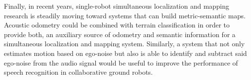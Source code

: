 Finally, in recent years, single-robot simultaneous localization and mapping
research is steadily moving toward systems that can build metric-semantic maps.
Acoustic odometry could be combined with terrain classification in order to
provide both, an auxiliary source of odometry and semantic information for a
simultaneous localization and mapping system. Similarly, a system that not only
estimates motion based on ego-noise but also is able to identify and subtract
said ego-noise from the audio signal would be useful to improve the performance
of speech recognition in collaborative ground robots. 